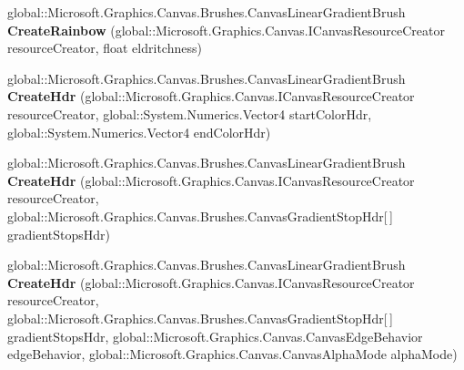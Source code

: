 \begin{DoxyCompactItemize}
\item 
\mbox{\label{interface_microsoft_1_1_graphics_1_1_canvas_1_1_brushes_1_1_i_canvas_linear_gradient_brush_statics_a10b64033cc76bb4670af23e94b8b6d1c}} 
global\+::\+Microsoft.\+Graphics.\+Canvas.\+Brushes.\+Canvas\+Linear\+Gradient\+Brush {\bfseries Create\+Rainbow} (global\+::\+Microsoft.\+Graphics.\+Canvas.\+I\+Canvas\+Resource\+Creator resource\+Creator, float eldritchness)
\item 
\mbox{\label{interface_microsoft_1_1_graphics_1_1_canvas_1_1_brushes_1_1_i_canvas_linear_gradient_brush_statics_aa478a0f38fa948c5b103ee834fb17cb9}} 
global\+::\+Microsoft.\+Graphics.\+Canvas.\+Brushes.\+Canvas\+Linear\+Gradient\+Brush {\bfseries Create\+Hdr} (global\+::\+Microsoft.\+Graphics.\+Canvas.\+I\+Canvas\+Resource\+Creator resource\+Creator, global\+::\+System.\+Numerics.\+Vector4 start\+Color\+Hdr, global\+::\+System.\+Numerics.\+Vector4 end\+Color\+Hdr)
\item 
\mbox{\label{interface_microsoft_1_1_graphics_1_1_canvas_1_1_brushes_1_1_i_canvas_linear_gradient_brush_statics_ac231ec716863bab8840f768a97c723a7}} 
global\+::\+Microsoft.\+Graphics.\+Canvas.\+Brushes.\+Canvas\+Linear\+Gradient\+Brush {\bfseries Create\+Hdr} (global\+::\+Microsoft.\+Graphics.\+Canvas.\+I\+Canvas\+Resource\+Creator resource\+Creator, global\+::\+Microsoft.\+Graphics.\+Canvas.\+Brushes.\+Canvas\+Gradient\+Stop\+Hdr\mbox{[}$\,$\mbox{]} gradient\+Stops\+Hdr)
\item 
\mbox{\label{interface_microsoft_1_1_graphics_1_1_canvas_1_1_brushes_1_1_i_canvas_linear_gradient_brush_statics_a9d2b811c75f53b8dd5784da5b0d87a96}} 
global\+::\+Microsoft.\+Graphics.\+Canvas.\+Brushes.\+Canvas\+Linear\+Gradient\+Brush {\bfseries Create\+Hdr} (global\+::\+Microsoft.\+Graphics.\+Canvas.\+I\+Canvas\+Resource\+Creator resource\+Creator, global\+::\+Microsoft.\+Graphics.\+Canvas.\+Brushes.\+Canvas\+Gradient\+Stop\+Hdr\mbox{[}$\,$\mbox{]} gradient\+Stops\+Hdr, global\+::\+Microsoft.\+Graphics.\+Canvas.\+Canvas\+Edge\+Behavior edge\+Behavior, global\+::\+Microsoft.\+Graphics.\+Canvas.\+Canvas\+Alpha\+Mode alpha\+Mode)

\end{DoxyCompactItemize}
